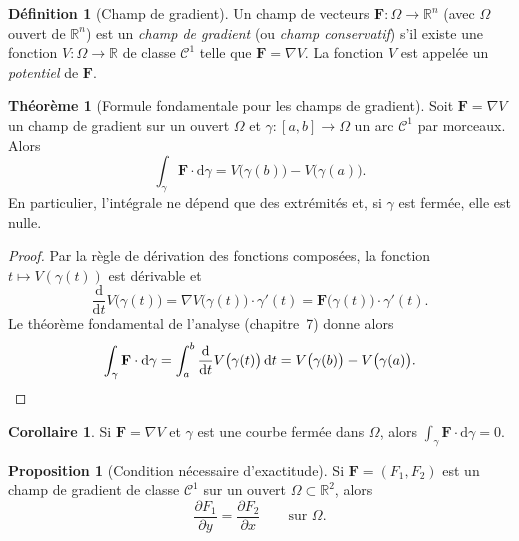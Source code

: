 \documentclass[12pt,a4paper,openany]{book}
\theoremstyle{definition}
\newtheorem{definition}{Définition}[chapter]
\newtheorem{theoreme}{Théorème}[chapter]
\newtheorem{proposition}{Proposition}[chapter]
\newtheorem{corollaire}{Corollaire}[chapter]
\newcommand{\R}{\mathbb{R}}
\newcommand{\dd}{\mathrm{d}}
\begin{document}

\begin{definition}[Champ de gradient]\label{def:champ-gradient}
  Un champ de vecteurs $\mathbf{F}\colon\Omega\to\R^n$ (avec $\Omega$
  ouvert de $\R^n$) est un \emph{champ de gradient}
  (ou \emph{champ conservatif}) s'il existe une
  fonction $V\colon\Omega\to\R$ de classe $\mathcal{C}^1$ telle que
  $\mathbf{F} = \nabla V$. La fonction $V$ est appelée un
  \emph{potentiel} de $\mathbf{F}$.
\end{definition}

\begin{theoreme}[Formule fondamentale pour les champs de gradient]
  \label{thm:gradient-potentiel}
  Soit $\mathbf{F} = \nabla V$ un champ de gradient sur un ouvert
  $\Omega$ et $\gamma\colon[a,b]\to\Omega$ un arc $\mathcal{C}^1$ par
  morceaux. Alors
  \begin{equation}\label{eq:gradient-potentiel}
    \int_\gamma \mathbf{F}\cdot\dd\gamma
    = V\bigl(\gamma(b)\bigr) - V\bigl(\gamma(a)\bigr).
  \end{equation}
  En particulier, l'intégrale ne dépend que des extrémités et, si
  $\gamma$ est fermée, elle est nulle.
\end{theoreme}

\begin{proof}
  Par la règle de dérivation des fonctions composées, la fonction
  $t \mapsto V(\gamma(t))$ est dérivable et
  \[
    \frac{\dd}{\dd t}V\bigl(\gamma(t)\bigr)
    = \nabla V\bigl(\gamma(t)\bigr)\cdot\gamma'(t)
    = \mathbf{F}\bigl(\gamma(t)\bigr)\cdot\gamma'(t).
  \]
  Le théorème fondamental de l'analyse (chapitre~7) donne alors
  \[
    \int_\gamma\mathbf{F}\cdot\dd\gamma
    = \int_a^b \frac{\dd}{\dd t}V\bigl(\gamma(t)\bigr)\,\dd t
    = V\bigl(\gamma(b)\bigr) - V\bigl(\gamma(a)\bigr). \qedhere
  \]
\end{proof}

\begin{corollaire}\label{cor:circulation-nulle-gradient}
  Si $\mathbf{F} = \nabla V$ et $\gamma$ est une courbe fermée dans
  $\Omega$, alors $\displaystyle\int_\gamma\mathbf{F}\cdot\dd\gamma = 0$.
\end{corollaire}

\begin{proposition}[Condition nécessaire d'exactitude]
  \label{prop:condition-necessaire-exacte}
  Si $\mathbf{F} = (F_1, F_2)$ est un champ de gradient de classe
  $\mathcal{C}^1$ sur un ouvert $\Omega \subset \R^2$, alors
  \begin{equation}\label{eq:condition-exacte}
    \frac{\partial F_1}{\partial y} = \frac{\partial F_2}{\partial x}
    \qquad\text{sur } \Omega.
  \end{equation}
\end{proposition}
\end{document}
